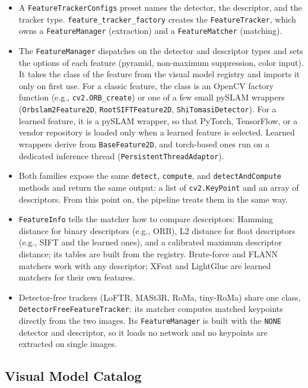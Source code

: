 \documentclass{article}
\begin{document}
\begin{itemize}
\item A \texttt{FeatureTrackerConfigs} preset names the detector, the descriptor, and the tracker type. \texttt{feature\_tracker\_factory} creates the \texttt{FeatureTracker}, which owns a \texttt{FeatureManager} (extraction) and a \texttt{FeatureMatcher} (matching).
\item The \texttt{FeatureManager} dispatches on the detector and descriptor types and sets the options of each feature (pyramid, non-maximum suppression, color input). It takes the class of the feature from the visual model registry and imports it only on first use. For a classic feature, the class is an OpenCV factory function (e.g., \texttt{cv2.ORB\_create}) or one of a few small pySLAM wrappers (\texttt{Orbslam2Feature2D}, \texttt{RootSIFTFeature2D}, \texttt{ShiTomasiDetector}). For a learned feature, it is a pySLAM wrapper, so that PyTorch, TensorFlow, or a vendor repository is loaded only when a learned feature is selected. Learned wrappers derive from \texttt{BaseFeature2D}, and torch-based ones run on a dedicated inference thread (\texttt{PersistentThreadAdaptor}).
\item Both families expose the same \texttt{detect}, \texttt{compute}, and \texttt{detectAndCompute} methods and return the same output: a list of \texttt{cv2.KeyPoint} and an array of descriptors. From this point on, the pipeline treats them in the same way.
\item \texttt{FeatureInfo} tells the matcher how to compare descriptors: Hamming distance for binary descriptors (e.g., ORB), L2 distance for float descriptors (e.g., SIFT and the learned ones), and a calibrated maximum descriptor distance; its tables are built from the registry. Brute-force and FLANN matchers work with any descriptor; XFeat and LightGlue are learned matchers for their own features.
\item Detector-free trackers (LoFTR, MASt3R, RoMa, tiny-RoMa) share one class, \texttt{DetectorFreeFeatureTracker}: its matcher computes matched keypoints directly from the two images. Its \texttt{FeatureManager} is built with the \texttt{NONE} detector and descriptor, so it loads no network and no keypoints are extracted on single images.
\end{itemize}

\hypertarget{visual-model-catalog}{%
\subsection{Visual Model Catalog}\label{visual-model-catalog}}
\end{document}
